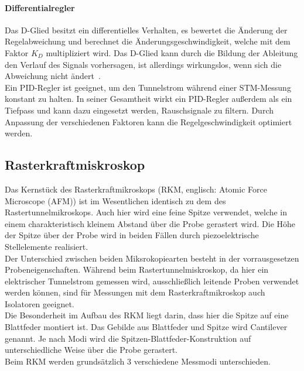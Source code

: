 \documentclass[a4paper,twoside,final]{article}
\begin{document}
\paragraph{Differentialregler} Das D-Glied besitzt ein differentielles Verhalten, es bewertet die Änderung der Regelabweichung und berechnet die Änderungsgeschwindigkeit, welche mit dem Faktor $K_D$ multipliziert wird. Das D-Glied kann durch die Bildung der Ableitung den Verlauf des Signals \glqq vorhersagen\grqq, ist allerdings wirkungslos, wenn sich die Abweichung nicht ändert~\cite{Forker}.\\
Ein PID-Regler ist geeignet, um den Tunnelstrom während einer STM-Messung konstant zu halten. In seiner Gesamtheit wirkt ein PID-Regler außerdem als ein Tiefpass und kann dazu eingesetzt werden, Rauschsignale zu filtern. Durch Anpassung der verschiedenen Faktoren kann die Regelgeschwindigkeit optimiert werden.
\subsection{Rasterkraftmiskroskop}
Das Kernstück des Rasterkraftmikroskops (RKM, englisch: Atomic Force Microscope (AFM)) ist im Wesentlichen identisch zu dem des Rastertunnelmikroskops. Auch hier wird eine feine Spitze verwendet, welche in einem charakteristisch kleinem Abstand über die Probe gerastert wird. Die Höhe der Spitze über der Probe wird in beiden Fällen durch piezoelektrische Stellelemente realisiert. \\
Der Unterschied zwischen beiden Miksrokopiearten besteht in der vorrausgesetzen Probeneigenschaften. Während beim Rastertunnelmiskroskop, da hier ein elektrischer Tunnelstrom gemessen wird, ausschließlich leitende Proben verwendet werden können, sind für Messungen mit dem Rasterkraftmikroskop auch Isolatoren geeignet.\\

Die Besonderheit im Aufbau des RKM liegt darin, dass hier die Spitze auf eine Blattfeder montiert ist. Das Gebilde aus Blattfeder und Spitze wird Cantilever genannt. Je nach Modi wird die Spitzen-Blattfeder-Konstruktion auf unterschiedliche Weise über die Probe gerastert.\\
Beim RKM werden grundsätzlich 3 verschiedene Messmodi unterschieden.
\end{document}
